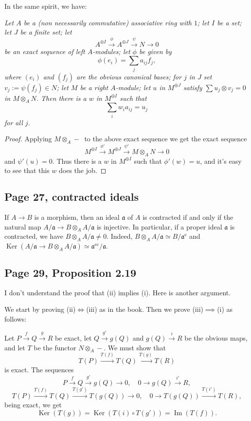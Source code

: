 \documentclass[parskip=half,fontsize=12pt]{scrartcl}%
\newcommand{\oo}{\operatorname}\newcommand{\ooo}{\operatorname*}
\newcommand{\mf}{\mathfrak}
\newcommand{\Ker}{\operatorname{Ker}}\newcommand{\Coker}{\operatorname{Coker}}
\newcommand{\xr}{\xrightarrow}
\begin{document}
In the same spirit, we have:

\emph{Let $A$ be a (non necessarily commutative) associative ring with $1$; let $I$ be a set; let $J$ be a finite set; let 
$$
A^{\oplus I}\xrightarrow\phi A^{\oplus J}\xrightarrow\psi N\to0
$$ 
be an exact sequence of left $A$-modules; let $\phi$ be given by 
$$
\phi(e_i)=\sum_ja_{ij}f_j,
$$ 
where $(e_i)$ and $(f_j)$ are the obvious canonical bases; for $j$ in $J$ set $v_j:=\psi(f_j)\in N$; let $M$ be a right $A$-module; let $u$ in $M^{\oplus J}$ satisfy $\sum u_j\otimes v_j=0$ in $M\otimes_AN$. Then there is a $w$ in $M^{\oplus I}$ such that 
$$
\sum_iw_ia_{ij}=u_j
$$ 
for all $j$.}

\begin{proof} 
Applying $M\otimes_A-\ $ to the above exact sequence we get the exact sequence 
$$
M^{\oplus I}\xrightarrow{\phi'}M^{\oplus J}\xrightarrow{\psi'}M\otimes_AN\to0
$$ 
and $\psi'(u)=0$. Thus there is a $w$ in $M^{\oplus I}$ such that $\phi'(w)=u$, and it's easy to see that this $w$ does the job. 
\end{proof}

\subsection{Page 27, contracted ideals}\label{27}%

If $A\to B$ is a morphism, then an ideal $\mf a$ of $A$ is contracted if and only if the natural map $A/\mf a\to B\otimes_A A/\mf a$ is injective. In particular, if a proper ideal $\mf a$ is contracted, we have $B\otimes_A A/\mf a\ne0$. Indeed, $B\otimes_A A/\mf a\simeq B/\mf a^{\oo e}$ and $\oo{Ker}(A/\mf a\to B\otimes_A A/\mf a)\simeq\mf a^{\oo{ec}}/\mf a$. %

\subsection{Page 29, Proposition 2.19}%

I don't understand the proof that (ii) implies (i). Here is another argument.

We start by proving (ii)$\iff$(iii) as in the book. Then we prove (iii)$\implies$(i) as follows:

Let $P\xr fQ\xr gR$ be exact, let $Q\xr{g'}g(Q)$ and $g(Q)\xr iR$ be the obvious maps, and let $T$ be the functor $N\otimes_A-$. We must show that 
$$
T(P)\xr{T(f)}T(Q)\xr{T(g)}T(R)
$$ 
is exact. The sequences 
$$
P\xr fQ\xr{g'}g(Q)\to0,\quad0\to g(Q)\xr{i'}R,
$$ 
$$
T(P)\xr{T(f)}T(Q)\xr{T(g')}T(g(Q))\to0,\quad0\to T(g(Q))\xr{T(i')}T(R),
$$ 
being exact, we get 
$$
\Ker(T(g))=\Ker(T(i)\circ T(g'))=\oo{Im}(T(f)).
$$
\end{document}
